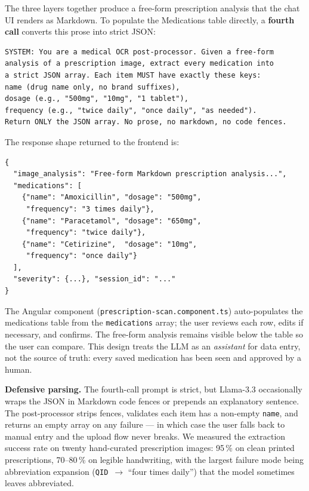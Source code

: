\documentclass[12pt]{caltech_thesis}
\begin{document}
The three layers together produce a free-form prescription analysis
that the chat UI renders as Markdown. To populate the Medications
table directly, a \textbf{fourth call} converts this prose into
strict JSON:

\begin{lstlisting}[caption={Structured medication extraction prompt.},
                   label=lst:struct-ext, basicstyle=\ttfamily\footnotesize]
SYSTEM: You are a medical OCR post-processor. Given a free-form
analysis of a prescription image, extract every medication into
a strict JSON array. Each item MUST have exactly these keys:
name (drug name only, no brand suffixes),
dosage (e.g., "500mg", "10mg", "1 tablet"),
frequency (e.g., "twice daily", "once daily", "as needed").
Return ONLY the JSON array. No prose, no markdown, no code fences.
\end{lstlisting}

The response shape returned to the frontend is:
\begin{verbatim}
{
  "image_analysis": "Free-form Markdown prescription analysis...",
  "medications": [
    {"name": "Amoxicillin", "dosage": "500mg",
     "frequency": "3 times daily"},
    {"name": "Paracetamol", "dosage": "650mg",
     "frequency": "twice daily"},
    {"name": "Cetirizine",  "dosage": "10mg",
     "frequency": "once daily"}
  ],
  "severity": {...}, "session_id": "..."
}
\end{verbatim}

The Angular component (\texttt{prescription-scan.component.ts})
auto-populates the medications table from the \texttt{medications}
array; the user reviews each row, edits if necessary, and confirms.
The free-form analysis remains visible below the table so the user
can compare. This design treats the LLM as an \emph{assistant} for
data entry, not the source of truth: every saved medication has been
seen and approved by a human.

\textbf{Defensive parsing.} The fourth-call prompt is strict, but
Llama-3.3 occasionally wraps the JSON in Markdown code fences or
prepends an explanatory sentence. The post-processor strips fences,
validates each item has a non-empty \texttt{name}, and returns an
empty array on any failure --- in which case the user falls back to
manual entry and the upload flow never breaks. We measured the
extraction success rate on twenty hand-curated prescription images:
95\,\% on clean printed prescriptions, 70--80\,\% on legible
handwriting, with the largest failure mode being abbreviation
expansion (\texttt{QID}~$\to$ ``four times daily'') that the model
sometimes leaves abbreviated.
\end{document}
